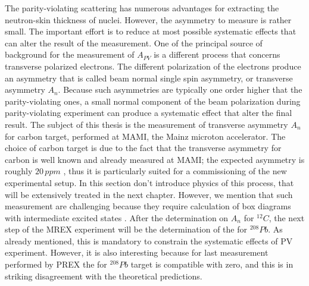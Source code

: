 
The parity-violating scattering has numerous advantages for extracting the neutron-skin thickness of nuclei. However, the asymmetry to measure is rather small. The important effort is to reduce at most possible systematic effects that can alter the result of the measurement. One of the principal source of background for the measurement of $A_{PV}$ is a different process that concerns transverse polarized electrons. The different polarization of the electrons produce an asymmetry that is called beam normal single spin asymmetry, or transverse asymmetry $A_{n}$. Because such asymmetries are typically one order higher that the parity-violating ones, a small normal component of the beam polarization during parity-violating experiment can produce a systematic effect that alter the final result. The subject of this thesis is the measurement of transverse asymmetry $A_{n}$ for carbon target, performed at MAMI, the Mainz microton accelerator. The choice of carbon target is due to the fact that the transverse asymmetry for carbon is well known and already measured at MAMI; the expected asymmetry is roughly $20 \, ppm$ , thus it is particularly suited for a commissioning of the new experimental setup. In this section don't introduce physics of this process, that will be extensively treated in the next chapter. However, we mention that such measurement are challenging because they require calculation of box diagrams with intermediate excited states \cite{Gorchtein_2008}.
After the determination on $A_{n}$ for $^{12}C$, the next step of the MREX experiment will be the determination of the \transv for $^{208}Pb$. As already mentioned, this is mandatory to constrain the systematic effects of PV experiment. However, it is also interesting because for last measurement performed by PREX \cite{HAPPEX:2012fud} the \transv for $^{208}Pb$ target is compatible with zero, and this is in striking disagreement with the theoretical predictions. 
